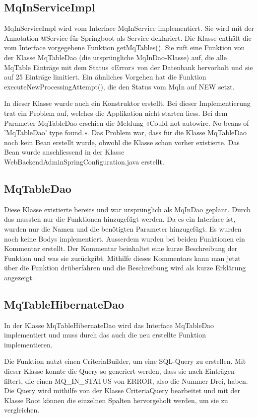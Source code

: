 \subsection{MqInServiceImpl}
MqInServiceImpl wird vom Interface MqInService implementiert. Sie wird mit der Annotation @Service für Springboot als Service deklariert. Die Klasse enthält die vom Interface vorgegebene Funktion getMqTables(). Sie ruft eine Funktion von der Klasse MqTableDao (die ursprüngliche MqInDao-Klasse) auf, die alle MqTable Einträge mit dem Status «Error» von der Datenbank hervorholt und sie auf 25 Einträge limitiert. Ein ähnliches Vorgehen hat die Funktion executeNewProcessingAttempt(), die den Status vom MqIn auf NEW setzt.    

In dieser Klasse wurde auch ein Konstruktor erstellt. Bei dieser Implementierung trat ein Problem auf, welches die Applikation nicht starten liess. Bei dem Parameter MqTableDao erschien die Meldung «Could not autowire. No beans of 'MqTableDao' type found.». Das Problem war, dass für die Klasse MqTableDao noch kein Bean erstellt wurde, obwohl die Klasse schon vorher existierte. Das Bean wurde anschliessend in der Klasse WebBackendAdminSpringConfiguration.java erstellt.

\subsection{MqTableDao}
Diese Klasse existierte bereits und war ursprünglich als MqInDao geplant. Durch das mussten nur die Funktionen hinzugefügt werden. Da es ein Interface ist, wurden nur die Namen und die benötigten Parameter hinzugefügt. Es wurden noch keine Bodys implementiert. Ausserdem wurden bei beiden Funktionen ein Kommentar erstellt. Der Kommentar beinhaltet eine kurze Beschreibung der Funktion und was sie zurückgibt. Mithilfe dieses Kommentars kann man jetzt über die Funktion drüberfahren und die Beschreibung wird als kurze Erklärung angezeigt.

\subsection{MqTableHibernateDao}
In der Klasse MqTableHibernateDao wird das Interface MqTableDao implementiert und muss durch das auch die neu erstellte Funktion implementieren.

Die Funktion nutzt einen CriteriaBuilder, um eine SQL-Query zu erstellen. Mit dieser Klasse konnte die Query so generiert werden, dass sie nach Einträgen filtert, die einen MQ\_IN\_STATUS von ERROR, also die Nummer Drei, haben. Die Query wird mithilfe von der Klasse CriteriaQuery bearbeitet und mit der Klasse Root können die einzelnen Spalten hervorgeholt werden, um sie zu vergleichen.

